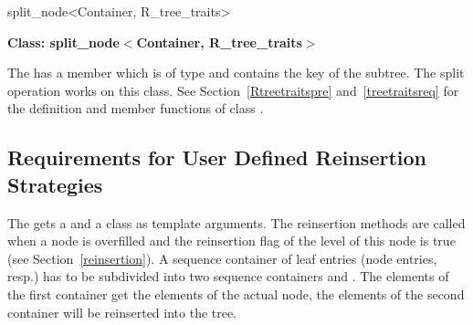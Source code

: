 \begin{ccClassTemplate}{split_node<Container,
    R_tree_traits>}

\noindent
{\bf Class: split\_node$<$Container,
    R\_tree\_traits$>$}


\ccDefinition
The  has a member
 which is of
type  and contains the key of the subtree.
The split operation works
on this class. 
See Section~\ref{Rtreetraitspre} and~\ref{treetraitsreq} for the definition and member
functions of class .


\ccCreation
{}

\ccOperations
{}

\end{ccClassTemplate}


\subsection{Requirements for User Defined Reinsertion Strategies}
\label{userreinsert}
\label{reinsertreq}
The  gets a  and a
  class as template
arguments. 
The reinsertion methods are called when a node is
overfilled and the reinsertion flag of the level of this node 
 is true (see Section~\ref{reinsertion}).
A sequence container of leaf  entries (node
entries, resp.) has to be subdivided into two sequence containers 
 and . The elements of the
first container get the elements of the actual node, the elements 
of the second container will be reinserted into the tree.


